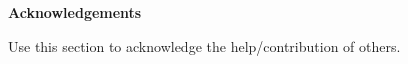 \begin{center}
    \textbf{\Large Acknowledgements}
    \end{center}
    
    Use this section to acknowledge the help/contribution of others.
    
    
\newpage